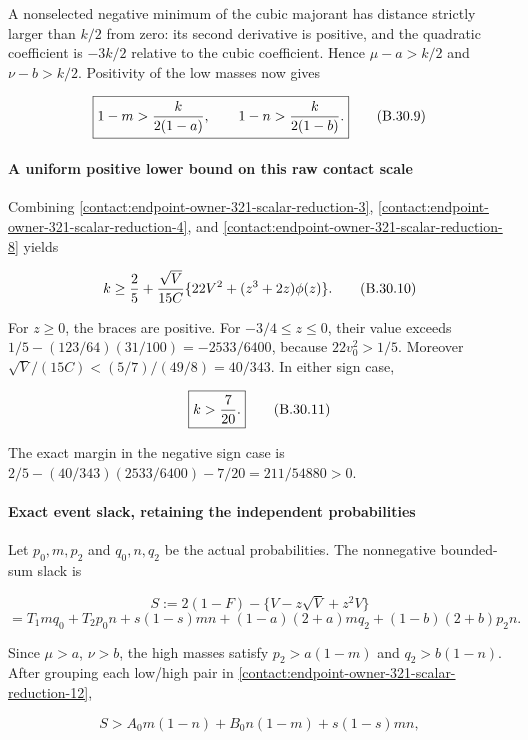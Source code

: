 A nonselected negative minimum of the cubic majorant has distance strictly
larger than $k/2$ from zero: its second derivative is positive, and the
quadratic coefficient is $-3k/2$ relative to the cubic coefficient. Hence
$\mu-a>k/2$ and $\nu-b>k/2$. Positivity of the low masses now gives

\[
 \boxed{1-m>{k\over2(1-a)},\qquad
 1-n>{k\over2(1-b)}.}
\tag{B.30.9}\label{contact:endpoint-owner-321-scalar-reduction-9}
\]

\paragraph{A uniform positive lower bound on this raw contact scale}

Combining \eqref{contact:endpoint-owner-321-scalar-reduction-3}, \eqref{contact:endpoint-owner-321-scalar-reduction-4}, and \eqref{contact:endpoint-owner-321-scalar-reduction-8} yields

\[
 k\ge{2\over5}+{\sqrt V\over15C}
       \{22V^2+(z^3+2z)\phi(z)\}.
\tag{B.30.10}\label{contact:endpoint-owner-321-scalar-reduction-10}
\]

For $z\ge 0$, the braces are positive. For $-3/4\le z\le 0$, their value exceeds
$1/5-(123/64)(31/100)=-2533/6400$, because $22v_0^2>1/5$.
Moreover $\sqrt{V}/(15C)<(5/7)/(49/8)=40/343$. In either sign case,

\[
 \boxed{k>{7\over20}.}
\tag{B.30.11}\label{contact:endpoint-owner-321-scalar-reduction-11}
\]

The exact margin in the negative sign case is
$2/5-(40/343)(2533/6400)-7/20=211/54880>0$.

\paragraph{Exact event slack, retaining the independent probabilities}

Let $p_0,m,p_2$ and $q_0,n,q_2$ be the actual probabilities. The nonnegative
bounded-sum slack is

\[
 S:=2(1-F)-\{V-z\sqrt V+z^2V\}
\]
\[
 =T_1mq_0+T_2p_0n+s(1-s)mn
 +(1-a)(2+a)mq_2+(1-b)(2+b)p_2n.
\tag{B.30.12}\label{contact:endpoint-owner-321-scalar-reduction-12}
\]

Since $\mu>a$, $\nu>b$, the high masses satisfy
$p_2>a(1-m)$ and $q_2>b(1-n)$. After grouping each low/high pair in \eqref{contact:endpoint-owner-321-scalar-reduction-12},

\[
 S>A_0m(1-n)+B_0n(1-m)+s(1-s)mn,
\]

